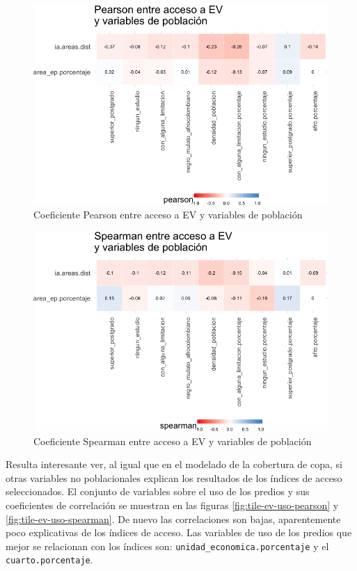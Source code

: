 \documentclass[12pt,]{book}
\begin{document}
\begin{figure}
\includegraphics[width=1\linewidth]{tesis-unigis_files/figure-latex/tile-ev-poblacion-pearson-1} \caption{Coeficiente Pearson entre acceso a EV y variables de población}\label{fig:tile-ev-poblacion-pearson}
\end{figure}

\begin{figure}
\includegraphics[width=1\linewidth]{tesis-unigis_files/figure-latex/tile-ev-poblacion-spearman-1} \caption{Coeficiente Spearman entre acceso a EV y variables de población}\label{fig:tile-ev-poblacion-spearman}
\end{figure}

Resulta interesante ver, al igual que en el modelado de la cobertura de
copa, si otras variables no poblacionales explican los resultados de los
índices de acceso seleccionados. El conjunto de variables sobre el uso
de los predios y sus coeficientes de correlación se muestran en las
figuras \ref{fig:tile-ev-uso-pearson} y \ref{fig:tile-ev-uso-spearman}.
De nuevo las correlaciones son bajas, aparentemente poco explicativas de
los índices de acceso. Las variables de uso de los predios que mejor se
relacionan con los índices son: \texttt{unidad\_economica.porcentaje} y
el \texttt{cuarto.porcentaje}.
\end{document}
